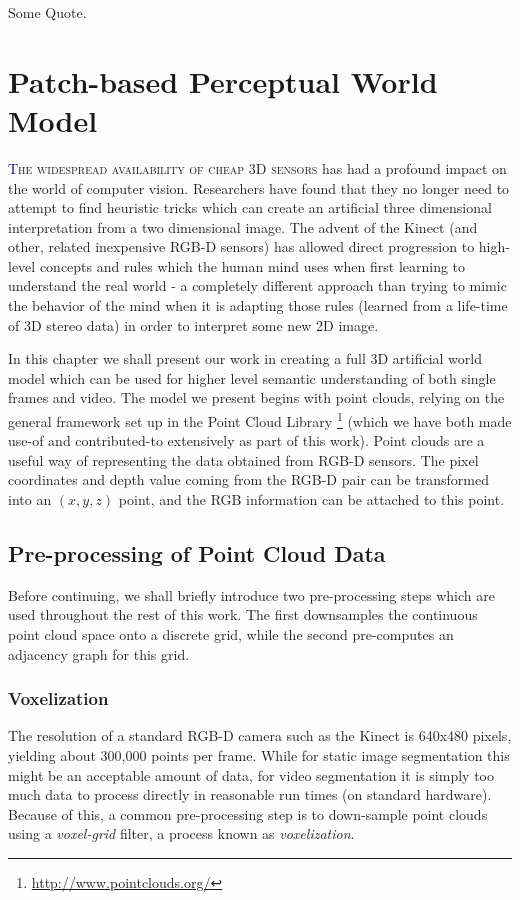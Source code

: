 \begin{savequote}[75mm]
Some Quote.
\end{savequote}


\chapter{Patch-based Perceptual World Model}
\label{Chap:WorldModel}
\lettrine[lines=3, loversize=0.3]{\textcolor{DarkBlue}T}{he widespread availability of cheap 3D sensors} has had a profound impact on the world of computer vision. Researchers have found that they no longer need to attempt to find heuristic tricks which can create an artificial three dimensional interpretation from a two dimensional image. The advent of the Kinect (and other, related inexpensive RGB-D sensors) has allowed direct progression to high-level concepts and rules which the human mind uses when first learning to understand the real world - a completely different approach than trying to mimic the behavior of the mind when it is adapting those rules (learned from a life-time of 3D stereo data) in order to interpret some new 2D image.

In this chapter we shall present our work in creating a full 3D artificial world model which can be used for higher level semantic understanding of both single frames and video. The model we present begins with point clouds, relying on the general framework set up in the Point Cloud Library \footnote{\url{http://www.pointclouds.org/}} (which we have both made use-of and contributed-to extensively as part of this work). Point clouds are a useful way of representing the data obtained from RGB-D sensors. The pixel coordinates and depth value coming from the RGB-D pair can be transformed into an $(x,y,z)$ point, and the RGB information can be attached to this point.

\section{Pre-processing of Point Cloud Data}
Before continuing, we shall briefly introduce two pre-processing steps which are used throughout the rest of this work. The first downsamples the continuous point cloud space onto a discrete grid, while the second pre-computes an adjacency graph for this grid.

\subsection{Voxelization}
The resolution of a standard RGB-D camera such as the Kinect is 640x480 pixels, yielding about 300,000 points per frame. While for static image segmentation this might be an acceptable amount of data, for video segmentation it is simply too much data to process directly in reasonable run times (on standard hardware). Because of this, a common pre-processing step is to down-sample point clouds using a \textit{voxel-grid} filter, a process known as \textit{voxelization}. 

